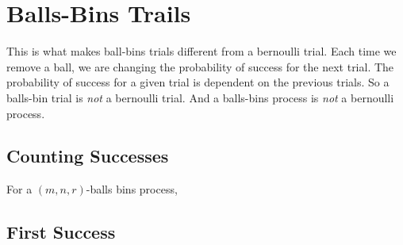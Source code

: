 \chapter{Balls-Bins Trails}



This is what makes ball-bins trials different from a bernoulli trial.
Each time we remove a ball, we are changing the probability of success for 
the next trial. The probability of success for a given trial is dependent 
on the previous trials. 
So a balls-bin trial is \textit{not} a bernoulli trial.
And a balls-bins process is \textit{not} a bernoulli process.

\section{Counting Successes}

For a $(m,n,r)$-balls bins process, 



\section{First Success}
